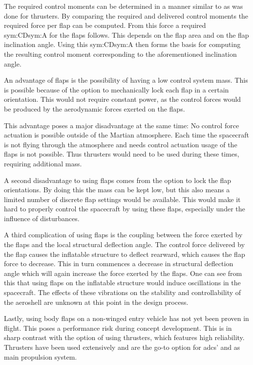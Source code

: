 The required control moments can be determined in a manner similar to as was done for thrusters. By comparing the required and delivered control moments the required force per flap can be computed. From this force a required \gls{sym:CD}\gls{sym:A} for the flaps follows. This depends on the flap area and on the flap inclination angle. Using this \gls{sym:CD}\gls{sym:A} then forms the basis for computing the resulting control moment corresponding to the aforementioned inclination angle.

An advantage of flaps is the possibility of having a low control system mass. This is possible because of the option to mechanically lock each flap in a certain orientation. This would not require constant power, as the control forces would be produced by the aerodynamic forces exerted on the flaps.

This advantage poses a major disadvantage at the same time: No control force actuation is possible outside of the Martian atmosphere. Each time the spacecraft is not flying through the atmosphere and needs control actuation usage of the flaps is not possible. Thus thrusters would need to be used during these times, requiring additional mass.

A second disadvantage to using flaps comes from the option to lock the flap orientations. By doing this the mass can be kept low, but this also means a limited number of discrete flap settings would be available. This would make it hard to properly control the spacecraft by using these flaps, especially under the influence of disturbances.

A third complication of using flaps is the coupling between the force exerted by the flaps and the local structural deflection angle. The control force delivered by the flap causes the inflatable structure to deflect rearward, which causes the flap force to decrease. This in turn commences a decrease in structural deflection angle which will again increase the force exerted by the flaps. One can see from this that using flaps on the inflatable structure would induce oscillations in the spacecraft. The effects of these vibrations on the stability and controllability of the aeroshell are unknown at this point in the design process.

Lastly, using body flaps on a non-winged entry vehicle has not yet been proven in flight. This poses a performance risk during concept development. This is in sharp contrast with the option of using thrusters, which features high reliability. Thrusters have been used extensively and are the go-to option for \gls{adcs}' and as main propulsion system.
